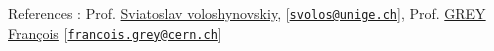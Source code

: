 \documentclass[a4paper,11pt]{article}
\newcommand*{\authorimg}[1]{%
  \raisebox{-0.1\baselineskip}{%
    \texttt{[image: \#1]}%
  }%
}
\begin{document}
% 
% 
% 
% 

{\fontsize{10}{10}\selectfont References : Prof. \href{http://sip.unige.ch/team/prof-sviatoslav-voloshynovskiy/}{Sviatoslav voloshynovskiy},
[\href{mailto:svolos@unige.ch}{\nolinkurl{svolos@unige.ch}}],
Prof. \href{https://itp.nyu.edu/itp/people/people.php?id=3273&group=All}{GREY François} 
[\href{mailto:francois.grey@cern.ch }{\nolinkurl{francois.grey@cern.ch}}]}
\end{document}
